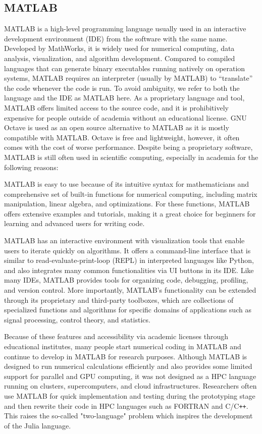\subsection{MATLAB}
MATLAB is a high-level programming language usually used in an interactive development environment (IDE) from the software with the same name.
Developed by MathWorks, it is widely used for numerical computing, data analysis, visualization, and algorithm development.
Compared to compiled languages that can generate binary executables running natively on operation systems, MATLAB requires an interpreter (usually by MATLAB) to ``translate'' the code whenever the code is run.
To avoid ambiguity, we refer to both the language and the IDE as MATLAB here.
As a proprietary language and tool, MATLAB offers limited access to the source code, and it is prohibitively expensive for people outside of academia without an educational license.
GNU Octave is used as an open source alternative to MATLAB as it is mostly compatible with MATLAB. Octave is free and lightweight, however, it often comes with the cost of worse performance.
Despite being a proprietary software, MATLAB is still often used in scientific computing, especially in academia for the following reasons:

MATLAB is easy to use because of its intuitive syntax for mathematicians and comprehensive set of built-in functions for numerical computing, including matrix manipulation, linear algebra, and optimizations. For these functions, MATLAB offers extensive examples and tutorials, making it a great choice for beginners for learning and advanced users for writing code.

MATLAB has an interactive environment with visualization tools that enable users to iterate quickly on algorithms. It offers a command-line interface that is similar to read-evaluate-print-loop (REPL) in interpreted languages like Python, and also integrates many common functionalities via UI buttons in its IDE.
Like many IDEs, MATLAB provides tools for organizing code, debugging, profiling, and version control.
More importantly, MATLAB's functionality can be extended through its proprietary and third-party toolboxes, which are collections of specialized functions and algorithms for specific domains of applications such as signal processing, control theory, and statistics.

Because of these features and accessibility via academic licenses through educational institutes, many people start numerical coding in MATLAB and continue to develop in MATLAB for research purposes. 
Although MATLAB is designed to run numerical calculations efficiently and also provides some limited support for parallel and GPU computing, it was not designed as a HPC language running on clusters, supercomputers, and cloud infrastructures. 
Researchers often use MATLAB for quick implementation and testing during the prototyping stage and then rewrite their code in HPC languages such as FORTRAN and C/C\texttt{++}. 
This raises the so-called "two-language" problem which inspires the development of the Julia language.

